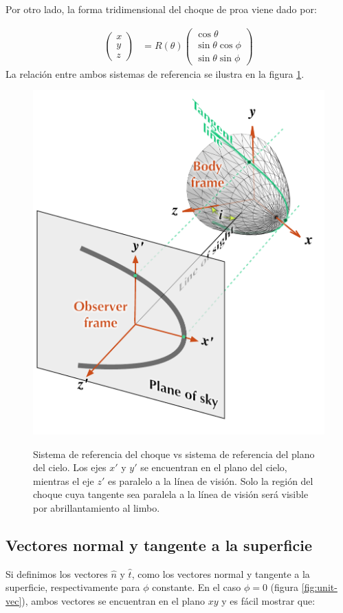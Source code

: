 Por otro lado, la forma tridimensional del choque de proa viene dado por:

\begin{align}
  \left(
  \begin{array}{c}
    x \\ y \\ z
  \end{array}
  \right) &=
            R(\theta)\left(
            \begin{array}{c}
              \cos\theta \\
              \sin\theta\cos\phi \\
              \sin\theta\sin\phi
            \end{array}
            \right)
\end{align}
La relación entre ambos sistemas de referencia se ilustra en la figura
\ref{fig:reference}.

\begin{figure}
  \includegraphics[width=0.5\linewidth]{./Figures/projection-pos}
  \label{fig:reference}
  \caption{Sistema de referencia del choque vs sistema de referencia del
    plano del cielo. Los ejes $x'$ y $y'$ se encuentran en el plano del
    cielo, mientras el eje $z'$ es paralelo a la línea de visión.
    Solo la regi\'on del choque cuya tangente sea paralela a la l\'inea
    de visión será visible por abrillantamiento al limbo.}
\end{figure}

\subsection{Vectores normal y tangente a la superficie}

Si definimos los vectores $\hat{n}$ y $\hat{t}$, como los vectores
normal y tangente a la superficie, respectivamente para $\phi$ constante.
En el caso $\phi = 0$ (figura \ref{fig:unit-vec}), ambos vectores se encuentran
en el plano $xy$ y es fácil mostrar que:

